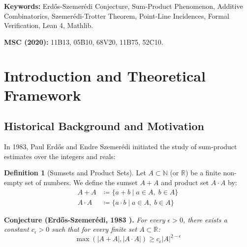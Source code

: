 \documentclass[11pt,a4paper]{article}
\theoremstyle{definition}
\newtheorem{definition}[theorem]{Definition}
\begin{document}
\vspace{0.5em}
\noindent\textbf{Keywords:} Erd\H{o}s-Szemer\'edi Conjecture, Sum-Product Phenomenon, Additive Combinatorics, Szemer\'edi-Trotter Theorem, Point-Line Incidences, Formal Verification, Lean 4, Mathlib.

\noindent\textbf{MSC (2020):} 11B13, 05B10, 68V20, 11B75, 52C10.

\tableofcontents
\newpage

\section{Introduction and Theoretical Framework}

\subsection{Historical Background and Motivation}
In 1983, Paul Erd\H{o}s and Endre Szemer\'edi \cite{erdos1983} initiated the study of sum-product estimates over the integers and reals:

\begin{definition}[Sumsets and Product Sets]\label{def:sumset_prod}
Let $A \subset \mathbb{N}$ (or $\mathbb{R}$) be a finite non-empty set of numbers. We define the sumset $A + A$ and product set $A \cdot A$ by:
\begin{align}
A + A &\coloneqq \{ a + b \mid a \in A, \; b \in A \} \label{eq:sumset} \\
A \cdot A &\coloneqq \{ a \cdot b \mid a \in A, \; b \in A \} \label{eq:prodset}
\end{align}
\end{definition}

\noindent\textbf{Conjecture (Erd\H{o}s-Szemer\'edi, 1983 \cite{erdos1983}).} \textit{For every $\epsilon > 0$, there exists a constant $c_\epsilon > 0$ such that for every finite set $A \subset \mathbb{R}$:}
\begin{equation}\label{eq:es_conj}
\max(|A + A|, |A \cdot A|) \ge c_\epsilon |A|^{2 - \epsilon}
\end{equation}
\end{document}
